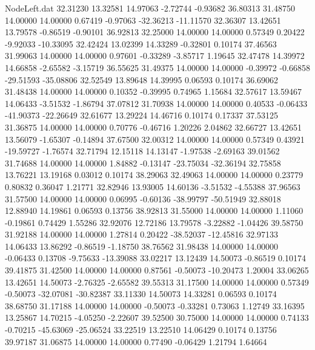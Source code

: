 \begin{filecontents}{NodeLeft.dat}
  32.31230   13.32581   14.97063    -2.72744   -0.93682   36.80313   31.48750   14.00000   14.00000    0.67419   -0.97063  -32.36213  -11.11570
  32.36307   13.42651   13.79578    -0.86519   -0.90101   36.92813   32.25000   14.00000   14.00000    0.57349    0.20422   -9.92033  -10.33095
  32.42424   13.02399   14.33289    -0.32801    0.10174   37.46563   31.99063   14.00000   14.00000    0.97601   -0.33289   -3.85717    1.19645
  32.47478   14.39972   14.66858    -2.65582   -3.15719   36.55625   31.49375   14.00000   14.00000   -0.39972   -0.66858  -29.51593  -35.08806
  32.52549   13.89648   14.39995     0.06593    0.10174   36.69062   31.48438   14.00000   14.00000    0.10352   -0.39995    0.74965    1.15684
  32.57617   13.59467   14.06433    -3.51532   -1.86794   37.07812   31.70938   14.00000   14.00000    0.40533   -0.06433  -41.90373  -22.26649
  32.61677   13.29224   14.46716     0.10174    0.17337   37.53125   31.36875   14.00000   14.00000    0.70776   -0.46716    1.20226    2.04862
  32.66727   13.42651   13.56079    -1.65307   -0.14894   37.67500   32.00312   14.00000   14.00000    0.57349    0.43921  -19.59727   -1.76574
  32.71794   12.15118   14.13147    -1.97538   -2.69163   39.01562   31.74688   14.00000   14.00000    1.84882   -0.13147  -23.75034  -32.36194
  32.75858   13.76221   13.19168     0.03012    0.10174   38.29063   32.49063   14.00000   14.00000    0.23779    0.80832    0.36047    1.21771
  32.82946   13.93005   14.60136    -3.51532   -4.55388   37.96563   31.57500   14.00000   14.00000    0.06995   -0.60136  -38.99797  -50.51949
  32.88018   12.88940   14.19861     0.06593    0.13756   38.92813   31.55000   14.00000   14.00000    1.11060   -0.19861    0.74429    1.55286
  32.92076   12.72186   13.79578    -3.22882   -1.04426   39.58750   31.92188   14.00000   14.00000    1.27814    0.20422  -38.52037  -12.45816
  32.97133   14.06433   13.86292    -0.86519   -1.18750   38.76562   31.98438   14.00000   14.00000   -0.06433    0.13708   -9.75633  -13.39088
  33.02217   13.12439   14.50073    -0.86519    0.10174   39.41875   31.42500   14.00000   14.00000    0.87561   -0.50073  -10.20473    1.20004
  33.06265   13.42651   14.50073    -2.76325   -2.65582   39.55313   31.17500   14.00000   14.00000    0.57349   -0.50073  -32.07081  -30.82387
  33.11330   14.50073   14.33281     0.06593    0.10174   38.68750   31.17188   14.00000   14.00000   -0.50073   -0.33281    0.73063    1.12749
  33.16395   13.25867   14.70215    -4.05250   -2.22607   39.52500   30.75000   14.00000   14.00000    0.74133   -0.70215  -45.63069  -25.06524
  33.22519   13.22510   14.06429     0.10174    0.13756   39.97187   31.06875   14.00000   14.00000    0.77490   -0.06429    1.21794    1.64664

\end{filecontents}
